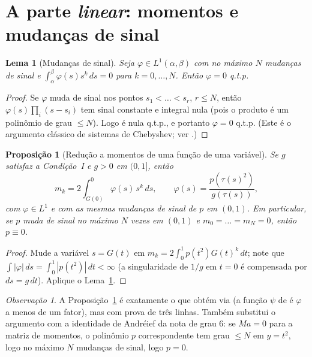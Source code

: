 \documentclass[11pt]{article}
\theoremstyle{plain}
\newtheorem{proposition}[theorem]{Proposição}
\newtheorem{lemma}[theorem]{Lema}
\theoremstyle{definition}
\theoremstyle{remark}
\newtheorem{remark}[theorem]{Observação}
\begin{document}
\section{A parte \emph{linear}: momentos e mudanças de sinal}\label{sec:momentos}

\begin{lemma}[Mudanças de sinal]\label{lem:sinal}
Seja $\varphi\in L^1(\alpha,\beta)$ com no máximo $N$ mudanças de sinal e
$\int_\alpha^\beta\varphi(s)s^k\,ds=0$ para $k=0,\dots,N$. Então $\varphi=0$ q.t.p.
\end{lemma}

\begin{proof}
Se $\varphi$ muda de sinal nos pontos $s_1<\dots<s_r$, $r\le N$, então
$\varphi(s)\prod_{i}(s-s_i)$ tem sinal constante e integral nula (pois o produto é
um polinômio de grau $\le N$). Logo é nula q.t.p., e portanto $\varphi=0$ q.t.p.
(Este é o argumento clássico de sistemas de Chebyshev; ver \cite{Kar68,PS72}.)
\end{proof}

\begin{proposition}[Redução a momentos de uma função de uma variável]\label{prop:redu}
Se $g$ satisfaz a Condição~I e $g>0$ em $(0,1]$, então
\[
 m_k=2\int_{G(0)}^0\varphi(s)\,s^k\,ds,\qquad
 \varphi(s)=\frac{p(\tau(s)^2)}{g(\tau(s))},
\]
com $\varphi\in L^1$ e com as mesmas mudanças de sinal de $p$ em $(0,1)$.
Em particular, se $p$ muda de sinal no máximo $N$ vezes em $(0,1)$ e
$m_0=\dots=m_N=0$, então $p\equiv0$.
\end{proposition}

\begin{proof}
Mude a variável $s=G(t)$ em $m_k=2\int_0^1p(t^2)G(t)^k\,dt$; note que
$\int|\varphi|\,ds=\int_0^1|p(t^2)|\,dt<\infty$ (a singularidade de $1/g$ em
$t=0$ é compensada por $ds=g\,dt$). Aplique o Lema~\ref{lem:sinal}.
\end{proof}

\begin{remark}
A Proposição~\ref{prop:redu} é exatamente o que \cite{ALA20} obtém via
\cite[Teo.~4.1]{BFY00a} (a função $\psi$ de \cite[\S3]{ALA20} é $\varphi$ a menos de
um fator), mas com prova de três linhas. Também substitui o argumento com a
identidade de Andréief da nota de grau 6: se $Ma=0$ para a matriz de momentos,
o polinômio $p$ correspondente tem grau $\le N$ em $y=t^2$, logo no máximo $N$
mudanças de sinal, logo $p=0$.
\end{remark}
\end{document}
